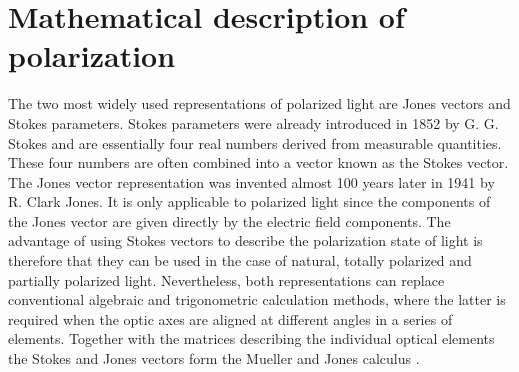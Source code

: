 \section{Mathematical description of polarization}
\label{sec:math_desc}
The two most widely used representations of polarized light are Jones vectors and Stokes parameters. Stokes parameters were already introduced in 1852 by G. G. Stokes and are essentially four real numbers derived from measurable quantities. These four numbers are often combined into a vector known as the Stokes vector. The Jones vector representation was invented almost 100 years later in 1941 by R. Clark Jones. It is only applicable to polarized light since the components of the Jones vector are given directly by the electric field components. The advantage of using Stokes vectors to describe the polarization state of light is therefore that they can be used in the case of natural, totally polarized and partially polarized light. Nevertheless, both representations can replace conventional algebraic and trigonometric calculation methods, where the latter is required when the optic axes are aligned at different angles in a series of elements. Together with the matrices describing the individual optical elements the Stokes and Jones vectors form the Mueller and Jones calculus \cite{Shurcliff1962PolarizedLight}. 

